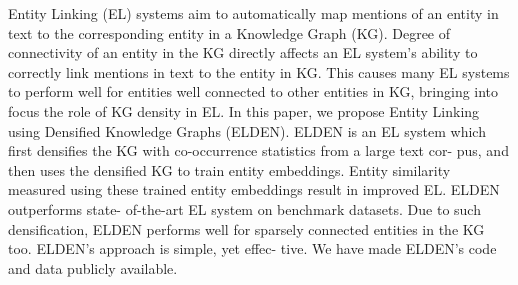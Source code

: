 Entity Linking (EL) systems aim to automatically map mentions of an entity in text to the corresponding entity in a Knowledge Graph (KG). Degree of connectivity of an entity in the KG directly affects an EL system's ability to correctly link mentions in text to the entity in KG. This causes many EL systems to perform well for entities well connected to other entities in KG, bringing into focus the role of KG density in EL. In this paper, we propose Entity Linking using Densified Knowledge Graphs (ELDEN). ELDEN is an EL system which first densifies the KG with co-occurrence statistics from a large text cor- pus, and then uses the densified KG to train entity embeddings. Entity similarity measured using these trained entity embeddings result in improved EL. ELDEN outperforms state- of-the-art EL system on benchmark datasets. Due to such densification, ELDEN performs well for sparsely connected entities in the KG too. ELDEN's approach is simple, yet effec- tive. We have made ELDEN's code and data publicly available.
